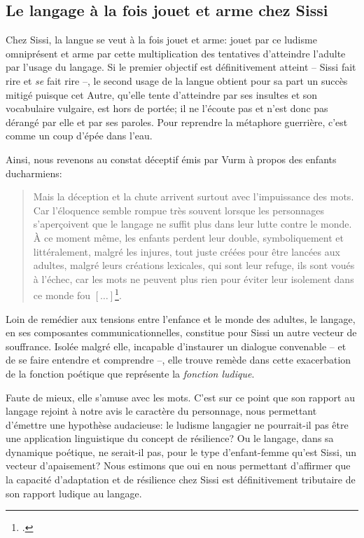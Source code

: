 \subsection{Le langage à la fois jouet et arme chez Sissi}
Chez Sissi, la langue se veut à la fois jouet et arme: jouet par ce ludisme omniprésent et arme par cette multiplication des tentatives d'atteindre l'adulte par l'usage du langage.
Si le premier objectif est définitivement atteint -- Sissi fait rire et \textit{se} fait rire --, le second usage de la langue obtient pour sa part un succès mitigé puisque cet Autre, qu'elle tente d'atteindre par ses insultes et son vocabulaire vulgaire, est hors de portée; il ne l'écoute pas et n'est donc pas dérangé par elle et par ses paroles.
Pour reprendre la métaphore guerrière, c'est comme un coup d'épée dans l'eau.
\par
Ainsi, nous revenons au constat déceptif émis par Vurm à propos des enfants ducharmiens:
\begin{quote}
  \begin{singlespace}
    \small
    Mais la déception et la chute arrivent surtout avec l'impuissance des mots. Car l'éloquence semble rompue très souvent lorsque les personnages s'aperçoivent que le langage ne suffit plus dans leur lutte contre le monde. À ce moment même, les enfants perdent leur double, symboliquement et littéralement, malgré les injures, tout juste créées pour être lancées aux adultes, malgré leurs créations lexicales, qui sont leur refuge, ils sont voués à l'échec, car les mots ne peuvent plus rien pour éviter leur isolement dans ce monde fou $\left[ \dots \right]$\footcite[101]{Vurm2014}.
    \normalsize
  \end{singlespace}
\end{quote}
Loin de remédier aux tensions entre l'enfance et le monde des adultes, le langage, en ses composantes communicationnelles, constitue pour Sissi un autre vecteur de souffrance.
Isolée malgré elle, incapable d'instaurer un dialogue convenable -- et de se faire entendre et comprendre --, elle trouve remède dans cette exacerbation de la fonction poétique que représente la \textit{fonction ludique}.
\par
Faute de mieux, elle s'amuse avec les mots.
C'est sur ce point que son rapport au langage rejoint à notre avis le caractère du personnage, nous permettant d'émettre une hypothèse audacieuse: le ludisme langagier ne pourrait-il pas être une application linguistique du concept de résilience?
Ou le langage, dans sa dynamique poétique, ne serait-il pas, pour le type d'enfant-femme qu'est Sissi, un vecteur d'apaisement?
Nous estimons que oui en nous permettant d'affirmer que la capacité d'adaptation et de résilience chez Sissi est définitivement tributaire de son rapport ludique au langage.

